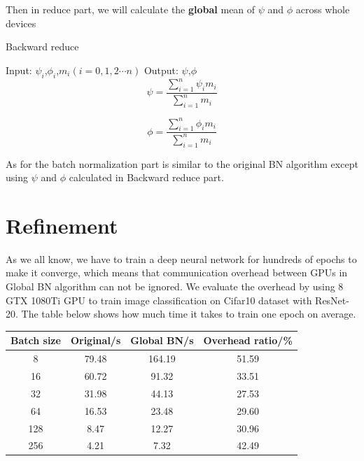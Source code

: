 Then in reduce part, we will calculate the \textbf{global} mean of $\psi$ and $\phi$ across whole devices

\begin{algorithm}
    \caption{Backward reduce}
    \label{alg:backward-reduce}
    \begin{algorithmic}[1]
        \State Input: $\psi_{i}$,$\phi_{i}$,$m_{i}$$(i = 0,1,2\cdots n)$
        \State Output: $\psi$,$\phi$
        \begin{equation}
            {\psi} = {\frac{ \sum_{i=1}^{n} {\psi_{i}} {m_{i}} }{\sum_{i=1}^{n} {m_{i}}}}
        \end{equation}

        \begin{equation}
            {\phi} = {\frac{ \sum_{i=1}^{n} {\phi_{i}} {m_{i}} }{ \sum_{i=1}^{n} {m_{i}}}}
        \end{equation}
    \end{algorithmic}
\end{algorithm}


As for the batch normalization part is similar to the original BN algorithm except using $\psi$ and $\phi$ calculated in Backward reduce part.
\section{Refinement}

As we all know, we have to train a deep neural network for hundreds of epochs to make it converge, which means that communication overhead between GPUs in Global BN algorithm can not be ignored. We evaluate the overhead by using 8 GTX 1080Ti GPU to  train image classification on Cifar10 dataset\cite{} with ResNet-20. The table below shows how much time it takes to train one epoch on average.

\begin{table}[!hbp]
    \begin{tabular}{|c|c|c|c|}
        \hline Batch size & Original/s & Global BN/s & Overhead ratio/\% \\
        \hline    8 & 79.48  &  164.19  & 51.59 \\
        \hline    16 & 60.72  &  91.32  & 33.51 \\
        \hline    32 &  31.98   &  44.13  &  27.53 \\
        \hline    64  &  16.53   &  23.48   & 29.60 \\
        \hline    128  &  8.47  &  12.27  &  30.96 \\
        \hline    256  &  4.21  &   7.32  &   42.49 \\
        \hline
    \end{tabular}
\end{table}


